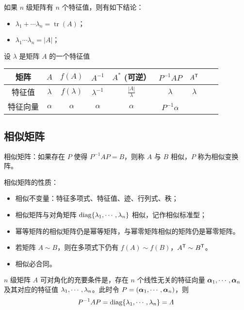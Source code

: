 如果 $n$ 级矩阵有 $n$ 个特征值，则有如下结论：
\begin{itemize}
	\item $\lambda_1 + \cdots \lambda_n = \operatorname{tr}(A)$；
	\item $\lambda_1 \cdots \lambda_n = |A|$；
\end{itemize}

设 $\lambda$ 是矩阵 $A$ 的一个特征值
\begin{table}[!ht]
	\centering
	\begin{tabular}{ccccccccc}
		\toprule
		矩阵   & $A$       & $f(A)$       & $A^{-1}$       & $A^{*}$ (可逆）           & $P^{-1}AP$     & ${A}^\mathsf{T}$ \\
		\midrule
		特征值  & $\lambda$ & $f(\lambda)$ & $\lambda^{-1}$ & $\frac{|A|}{ \lambda}$ & $\lambda$      & $\lambda$       \\
		特征向量 & $\alpha$  & $\alpha$     & $\alpha$       & $\alpha$               & $P^{-1}\alpha$ & ~               \\
		\bottomrule
	\end{tabular}
\end{table}

\subsection{相似矩阵}

相似矩阵：如果存在 $P$ 使得 $P^{-1} A P = B$，则称 $A$ 与 $B$ 相似，$P$ 称为相似变换阵。

相似矩阵的性质：
\begin{itemize}
	\item 相似不变量：特征多项式、特征值、迹、行列式、秩；
	\item 相似矩阵与对角矩阵 $\operatorname{diag}\{\lambda_1,\cdots,\lambda_n\}$ 相似，记作相似标准型；
	\item 幂等矩阵的相似矩阵仍是幂等矩阵，与幂零矩阵相似的矩阵仍是幂零矩阵。
	\item 若矩阵 $A \sim B$，则在多项式下仍有 $f(A) \sim f(B)$，${A}^\mathsf{T} \sim {B}^\mathsf{T}$。
	\item 相似必合同。
\end{itemize}

\begin{theorem}[可对角化的充要条件]
	$n$ 级矩阵 $A$ 可对角化的充要条件是，存在 $n$ 个线性无关的特征向量 $\boldsymbol{\alpha}_1,\cdots,\boldsymbol{\alpha}_n$ 及其对应的特征值 $\lambda_1,\cdots,\lambda_n$。此时令 $P = (\boldsymbol{\alpha}_1,\cdots,\boldsymbol{\alpha}_n)$，则
	\[ P^{-1}AP = \operatorname{diag} \{\lambda_1,\cdots,\lambda_n\} = \varLambda \]
\end{theorem}

